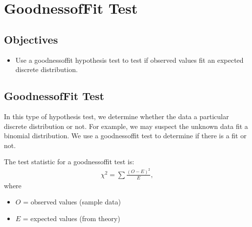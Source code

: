 \documentclass[letterpaper,10pt,english]{jupyterBook}
\begin{document}
\sphinxstepscope


\section{Goodness\sphinxhyphen{}of\sphinxhyphen{}Fit Test}
\label{\detokenize{Ch7 The Chi-Square Distribution/7.3 Goodness-of-Fit Test:goodness-of-fit-test}}\label{\detokenize{Ch7 The Chi-Square Distribution/7.3 Goodness-of-Fit Test::doc}}

\subsection{Objectives}
\label{\detokenize{Ch7 The Chi-Square Distribution/7.3 Goodness-of-Fit Test:objectives}}\begin{itemize}
\item {} 
\sphinxAtStartPar
Use a goodness\sphinxhyphen{}of\sphinxhyphen{}fit hypothesis test to test if observed values fit an expected discrete distribution.

\end{itemize}


\subsection{Goodness\sphinxhyphen{}of\sphinxhyphen{}Fit Test}
\label{\detokenize{Ch7 The Chi-Square Distribution/7.3 Goodness-of-Fit Test:id1}}
\sphinxAtStartPar
In this type of hypothesis test, we determine whether the data  a particular discrete distribution or not. For example, we may suspect the unknown data fit a binomial distribution. We use a goodness\sphinxhyphen{}of\sphinxhyphen{}fit test to determine if there is a fit or not.

\sphinxAtStartPar
The test statistic for a goodness\sphinxhyphen{}of\sphinxhyphen{}fit test is:
\begin{equation*}
\begin{split} \chi^2 = \sum \frac{(O - E)^2}{E}, \end{split}
\end{equation*}
\sphinxAtStartPar
where
\begin{itemize}
\item {} 
\sphinxAtStartPar
\(O\) = observed values (sample data)

\item {} 
\sphinxAtStartPar
\(E\) = expected values (from theory)

\end{itemize}
\end{document}
